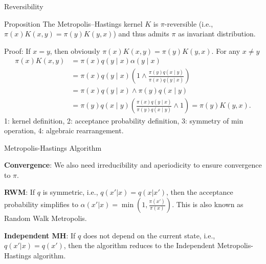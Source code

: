 \begin{frame}{Reversibility}
	\begin{block}{Proposition}
		The Metropolis--Hastings kernel $K$ is $\pi$-reversible (i.e., $\pi(x)K(x, y)  =\pi(y) K(y, x) $) and 
		thus admits $\pi$ as invariant distribution.
	\end{block}

	Proof:
	If $x = y$, then obviously $\pi(x)K(x, y) = \pi(y)K(y, x)$. For any $x \neq y$
	\begin{align}
		\pi(x)K(x, y) & = \pi(x)q(y \mid x)\alpha(y \mid x)                                                                    \\
		              & = \pi(x)q(y \mid x) \left(1 \wedge \frac{\pi(y)q(x \mid y)}{\pi(x)q(y \mid x)}\right)                  \\
		              & = \pi(x)q(y \mid x) \wedge \pi(y)q(x \mid y)                                                           \\
		              & = \pi(y)q(x \mid y) \left(\frac{\pi(x)q(y \mid x)}{\pi(y)q(x \mid y)} \wedge 1\right) = \pi(y)K(y, x).
	\end{align}
	{\tiny 1: kernel definition, 2: acceptance probability definition, 3: symmetry of min operation, 4: algebraic rearrangement.}
\end{frame}

\begin{frame}{Metropolis-Hastings Algorithm}

	\textbf{Convergence}: We also need irreducibility and aperiodicity to ensure convergence to $\pi$.

	\vspace{1cm}
	\textbf{RWM}: If $q$ is symmetric, i.e., $q(x'|x) = q(x|x')$, then the acceptance probability 
	simplifies to $\alpha(x'|x) = \min\left(1, \frac{\pi(x')}{\pi(x)}\right)$. 
	This is also known as Random Walk Metropolis.

	\vspace{1cm}
	\textbf{Independent MH}: If $q$ does not depend on the current state, 
	i.e., $q(x'|x) = q(x')$, then the algorithm reduces to the 
	Independent Metropolis-Hastings algorithm.
\end{frame}